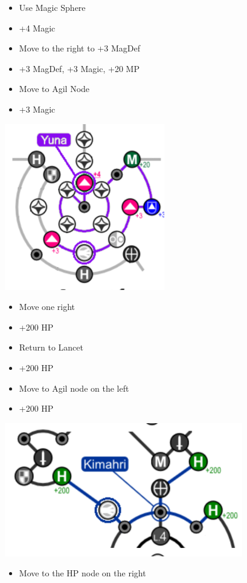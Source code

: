 \begin{spheregrid}
	\begin{itemize}
	\yunaf
	\begin{itemize}
		\item Use Magic Sphere
		\item +4 Magic
		\item Move to the right to +3 MagDef
		\item +3 MagDef, +3 Magic, +20 MP
		\item Move to Agil Node
		\item +3 Magic
	\end{itemize}
	\includegraphics{graphics/yunammr}
	\kimahrif
	\begin{itemize}
		\item Move one right
		\item +200 HP
		\item Return to Lancet
		\item +200 HP
		\item Move to Agil node on the left
		\item +200 HP
	\end{itemize}
	\includegraphics{graphics/kimahrimmr}
	\wakkaf
	\begin{itemize}
		\item Move to the HP node on the right

\end{itemize}
\end{itemize}
\end{spheregrid}
